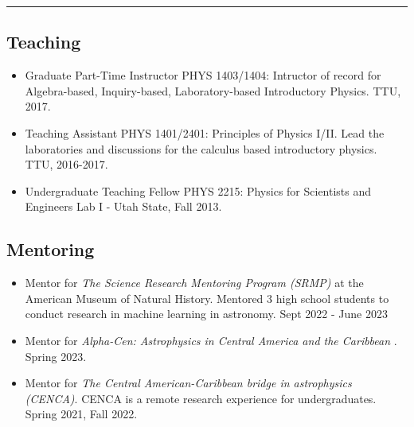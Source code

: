 \documentclass[letterpaper,10pt]{article}
\begin{document}
\hrule
\vspace{.3 cm}
\subsection*{Teaching}

\begin{itemize}[label=$\blacktriangleright$]
\item   Graduate Part-Time Instructor PHYS 1403/1404: Intructor of record for Algebra-based, Inquiry-based, Laboratory-based Introductory Physics. TTU, 2017.  
 
 \item   Teaching Assistant  PHYS 1401/2401: Principles of Physics I/II. Lead the laboratories and discussions for the calculus based introductory physics. TTU, 2016-2017.
  

 \item Undergraduate Teaching Fellow  PHYS 2215: Physics for Scientists and Engineers Lab I -  Utah State, Fall 2013.
 
 
 
  \end{itemize}
  
  \subsection*{Mentoring}

  
  \begin{itemize}[label=$\blacktriangleright$]
  
  \item Mentor for \emph{The Science Research Mentoring Program (SRMP)} at the American Museum of Natural History. Mentored 3 high school students to conduct research in machine learning in astronomy. Sept 2022 - June 2023

          \item Mentor for \emph{Alpha-Cen: Astrophysics in Central America and the Caribbean }. Spring 2023.

   \item Mentor for \emph{The Central American-Caribbean bridge in astrophysics (CENCA)}. CENCA is a remote research experience for undergraduates. Spring 2021, Fall 2022.
\end{itemize}
  
\end{document}
